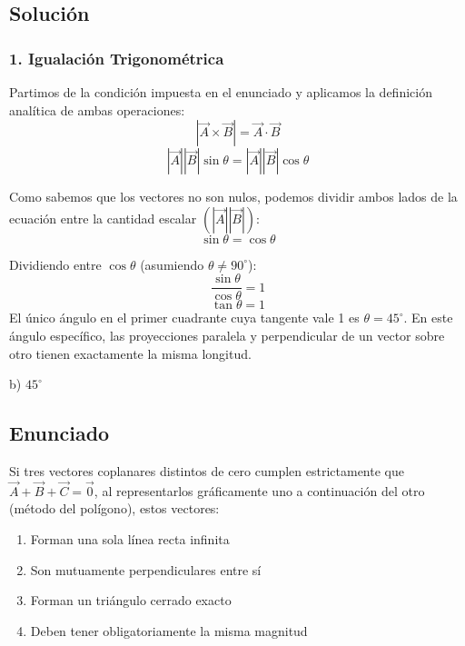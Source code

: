 \documentclass[12pt, a4paper]{article}
\begin{document}
\subsection*{Solución}

\subsubsection*{1. Igualación Trigonométrica}
Partimos de la condición impuesta en el enunciado y aplicamos la definición analítica de ambas operaciones:
$$ |\vec{A} \times \vec{B}| = \vec{A} \cdot \vec{B} $$
$$ |\vec{A}||\vec{B}|\sin\theta = |\vec{A}||\vec{B}|\cos\theta $$

Como sabemos que los vectores no son nulos, podemos dividir ambos lados de la ecuación entre la cantidad escalar $(|\vec{A}||\vec{B}|)$:
$$ \sin\theta = \cos\theta $$

Dividiendo entre $\cos\theta$ (asumiendo $\theta \neq 90^\circ$):
$$ \frac{\sin\theta}{\cos\theta} = 1 $$
$$ \tan\theta = 1 $$
El único ángulo en el primer cuadrante cuya tangente vale 1 es $\theta = 45^\circ$. En este ángulo específico, las proyecciones paralela y perpendicular de un vector sobre otro tienen exactamente la misma longitud.

\begin{tcolorbox}[colback=green!5!white, colframe=green!50!black, title=Respuesta Final]
\centering \Large b) $45^\circ$
\end{tcolorbox}

\newpage


\subsection*{Enunciado}
Si tres vectores coplanares distintos de cero cumplen estrictamente que $\vec{A} + \vec{B} + \vec{C} = \vec{0}$, al representarlos gráficamente uno a continuación del otro (método del polígono), estos vectores:
\begin{enumerate}[label=\alph*)]
    \item Forman una sola línea recta infinita
    \item Son mutuamente perpendiculares entre sí
    \item Forman un triángulo cerrado exacto
    \item Deben tener obligatoriamente la misma magnitud
\end{enumerate}
\end{document}
